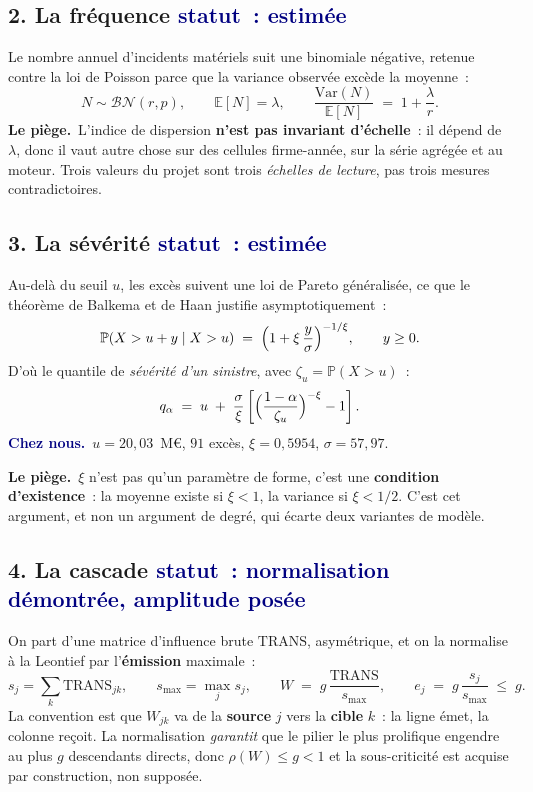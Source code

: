 \documentclass[11pt,a4paper]{article}
\newcommand{\cheznous}[1]{\smallskip\noindent\textcolor{navy}{\textbf{Chez nous.}}\ #1\par}
\newcommand{\lepiege}[1]{\smallskip\noindent\textcolor{accent}{\textbf{Le piège.}}\ #1\par}
\begin{document}
\subsection*{2. La fréquence \quad\small\textcolor{navy}{statut~: estimée}\normalsize}

Le nombre annuel d'incidents matériels suit une binomiale négative, retenue contre la loi de
Poisson parce que la variance observée excède la moyenne~:
\[
N \sim \mathcal{BN}(r,p), \qquad \mathbb{E}[N]=\lambda, \qquad
\frac{\mathrm{Var}(N)}{\mathbb{E}[N]} \;=\; 1+\frac{\lambda}{r}.
\]
\lepiege{L'indice de dispersion \textbf{n'est pas invariant d'échelle}~: il dépend de $\lambda$,
donc il vaut autre chose sur des cellules firme-année, sur la série agrégée et au moteur. Trois
valeurs du projet sont trois \emph{échelles de lecture}, pas trois mesures contradictoires.}

\subsection*{3. La sévérité \quad\small\textcolor{navy}{statut~: estimée}\normalsize}

Au-delà du seuil $u$, les excès suivent une loi de Pareto généralisée, ce que le théorème de
Balkema et de Haan justifie asymptotiquement~:
\[
\mathbb{P}(X>u+y \mid X>u) \;=\; \Bigl(1+\xi\,\frac{y}{\sigma}\Bigr)^{-1/\xi},
\qquad y\ge 0 .
\]
D'où le quantile de \emph{sévérité d'un sinistre}, avec $\zeta_u=\mathbb{P}(X>u)$~:
\[
q_\alpha \;=\; u \;+\; \frac{\sigma}{\xi}
\left[\Bigl(\frac{1-\alpha}{\zeta_u}\Bigr)^{-\xi}-1\right].
\]
\cheznous{$u=20{,}03$~M\euro, $91$ excès, $\xi=0{,}5954$, $\sigma=57{,}97$.}
\lepiege{$\xi$ n'est pas qu'un paramètre de forme, c'est une \textbf{condition d'existence}~: la
moyenne existe si $\xi<1$, la variance si $\xi<1/2$. C'est cet argument, et non un argument de
degré, qui écarte deux variantes de modèle.}

\subsection*{4. La cascade \quad\small\textcolor{navy}{statut~: normalisation démontrée, amplitude posée}\normalsize}

On part d'une matrice d'influence brute $\mathrm{TRANS}$, asymétrique, et on la normalise à la
Leontief par l'\textbf{émission} maximale~:
\[
s_j=\sum_k \mathrm{TRANS}_{jk}, \qquad s_{\max}=\max_j s_j, \qquad
W \;=\; g\,\frac{\mathrm{TRANS}}{s_{\max}}, \qquad
e_j \;=\; g\,\frac{s_j}{s_{\max}} \;\le\; g .
\]
\noindent La convention est que $W_{jk}$ va de la \textbf{source} $j$ vers la \textbf{cible} $k$~:
la ligne émet, la colonne reçoit. La normalisation \emph{garantit} que le pilier le plus prolifique
engendre au plus $g$ descendants directs, donc $\rho(W)\le g<1$ et la sous-criticité est acquise
par construction, non supposée.
\end{document}
